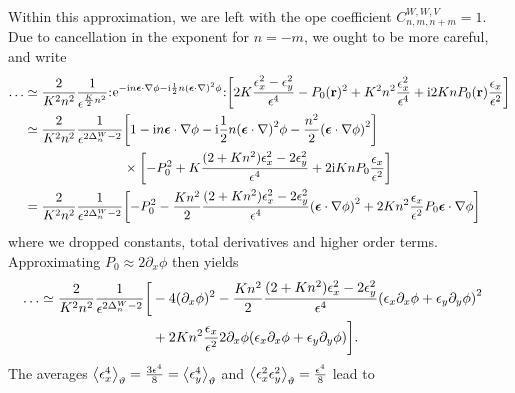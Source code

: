 Within this approximation, we are left with the \gls{ope} coefficient $C^{W,W,V}_{n,m,n+m} = 1$.\\
Due to cancellation in the exponent for $n=-m$, we ought to be more careful, and write
\begin{align*}
\dots &\simeq \frac{2}{K^2n^2} \frac{1}{\epsilon^{\frac{K}{2}n^2}} \normord{\powe{- \i n\bm{\epsilon}\cdot \nabla \phi - \i \frac{1}{2} n\kla*{\bm{\epsilon}\cdot\nabla }^2\phi}} \klb[\bigg]{2K \frac{\epsilon_x^2-\epsilon_y^2}{\epsilon^4} - P_0(\textbf{r})^2 + K^2n^2 \frac{\epsilon_x^2}{\epsilon^4} + \i 2Kn P_0(\textbf{r}) \frac{\epsilon_x}{\epsilon^2} }\\
&\simeq \frac{2}{K^2n^2} \frac{1}{\epsilon^{2\Delta^W_n - 2}} \bsplit{&\klb*{1 - \i n\bm{\epsilon}\cdot \nabla \phi - \i \frac{1}{2} n\kla*{\bm{\epsilon}\cdot\nabla }^2\phi - \frac{n^2}{2} \kla*{\bm{\epsilon}\cdot \nabla\phi}^2} \\
&\times \klb[\bigg]{-P_0^2 + K \frac{(2 + Kn^2)\epsilon_x^2-2\epsilon_y^2}{\epsilon^4} + 2\i Kn P_0 \frac{\epsilon_x}{\epsilon^2}}}\\
&= \frac{2}{K^2n^2} \frac{1}{\epsilon^{2\Delta^W_n - 2}} \klb[\bigg]{-P_0^2 - \frac{Kn^2}{2} \frac{(2+Kn^2)\epsilon_x^2 - 2\epsilon_y^2}{\epsilon^4} \kla*{\bm{\epsilon}\cdot\nabla\phi}^2 + 2Kn^2 \frac{\epsilon_x}{\epsilon^2} P_0 \bm{\epsilon}\cdot \nabla\phi}
\end{align*}
where we dropped constants, total derivatives and higher order terms.
Approximating $P_0 \approx 2\partial_x\phi$ then yields
\begin{align*}
\dots &\simeq \frac{2}{K^2n^2} \frac{1}{\epsilon^{2\Delta^W_n - 2}} \bsplit{\klb[\bigg]{ & -4 (\partial_x\phi)^2 - \frac{Kn^2}{2} \frac{(2+Kn^2)\epsilon_x^2 - 2\epsilon_y^2}{\epsilon^4} \kla*{\epsilon_x \partial_x\phi + \epsilon_y \partial_y\phi}^2 \\
& + 2Kn^2 \frac{\epsilon_x}{\epsilon^2} 2\partial_x\phi \kla*{\epsilon_x \partial_x\phi + \epsilon_y \partial_y\phi}}.}
\end{align*}
The averages $\bra*{\epsilon_x^4}_\vartheta = \frac{3\epsilon^4}{8} = \bra*{\epsilon_y^4}_\vartheta$ and $\bra*{\epsilon_x^2\epsilon_y^2}_\vartheta = \frac{\epsilon^4}{8}$ lead to
